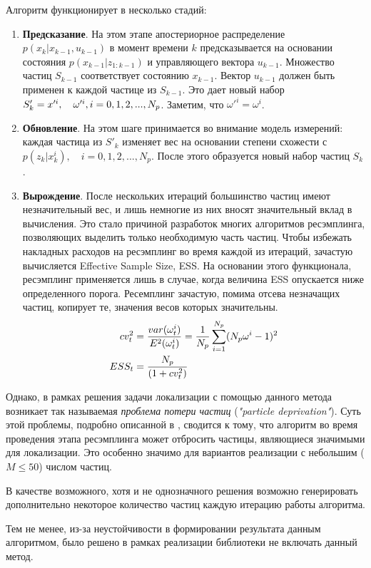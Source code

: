 Алгоритм функционирует в несколько стадий:
\begin{enumerate}
    \item
    \textbf{Предсказание}. На этом этапе апостериорное распределение \\$p(x_k | x_{k-1}, u_{k-1})$ в момент времени $k$ предсказывается на основании состояния $p(x_{k-1} | z_{1:k-1})$ и управляющего вектора $u_{k-1}$. Множество частиц $S_{k-1}$ соответствует состоянию $x_{k-1}$. Вектор $u_{k-1}$ должен быть применен к каждой частице из $S_{k-1}$. Это дает новый набор $S'_k = x'^i, \quad \omega'^i, \\ i=0,1,2,..., N_p$. Заметим, что $\omega'^i = \omega^i$.
    \item
    \textbf{Обновление}. На этом шаге принимается во внимание модель измерений: каждая частица из $S'_k$ изменяет вес на основании степени схожести с $p(z_k | x^i_k), \quad i=0,1,2,...,N_p$. После этого образуется новый набор частиц $S_k$.
    \item
    \textbf{Вырождение}. После нескольких итераций большинство частиц имеют незначительный вес, и лишь немногие из них вносят значительный вклад в вычисления. Это стало причиной разработок многих алгоритмов ресэмплинга, позволяющих выделить только необходимую часть частиц. Чтобы избежать накладных расходов на ресэмплинг во время каждой из итераций, зачастую вычисляется Effective Sample Size, ESS. На основании этого функционала, ресэмплинг применяется лишь в случае, когда величина ESS опускается ниже определенного порога. Ресемплинг зачастую, помима отсева незначащих частиц, копирует те, значения весов которых значительны.
    \begin{align}
        cv_t^2 &= \frac{var(\omega_t^i)}{ E^2(\omega_t^i) } = \frac{1}{N_p} \sum_{i=1}^{N_p} (N_p \omega^i - 1)^2 \notag \\
        ESS_t &= \frac{N_p}{(1+cv_t^2)} \notag
    \end{align}
\end{enumerate}

Однако, в рамках решения задачи локализации с помощью данного метода возникает так называемая \textit{проблема потери частиц} (\textit{"particle de\-pri\-va\-tion"}). Суть этой проблемы, подробно описанной в \cite{thrun2001robust}, сводится к тому, что алгоритм во время проведения этапа ресэмплинга может отбросить частицы, являющиеся значимыми для локализации. Это особенно значимо для вариантов реализации с небольшим ($M \leq 50$) числом частиц.

В качестве возможного, хотя и не однозначного решения возможно генерировать дополнительно некоторое количество частиц каждую итерацию работы алгоритма. 

Тем не менее, из-за неустойчивости в формировании результата данным алгоритмом, было решено в рамках реализации библиотеки не включать данный метод.